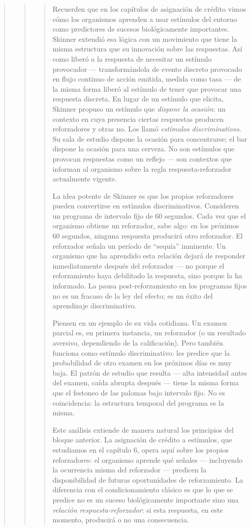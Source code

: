 \documentclass[
  letterpaper,
  DIV=11,
  numbers=noendperiod]{scrreprt}
\begin{document}
\begin{tcolorbox}[enhanced jigsaw, toprule=.15mm, arc=.35mm, colback=white, opacityback=0, colframe=quarto-callout-note-color-frame, breakable, rightrule=.15mm, left=2mm, leftrule=.75mm, bottomrule=.15mm]
\begin{quote}
\begin{quote}
\begin{quote}
Recuerden que en los capítulos de asignación de crédito vimos cómo los
organismos aprenden a usar estímulos del entorno como predictores de
sucesos biológicamente importantes. Skinner extendió esa lógica con un
movimiento que tiene la misma estructura que su innovación sobre las
respuestas. Así como liberó a la respuesta de necesitar un estímulo
provocador --- transformándola de evento discreto provocado en flujo
continuo de acción emitida, medida como tasa --- de la misma forma
liberó al estímulo de tener que provocar una respuesta discreta. En
lugar de un estímulo que elicita, Skinner propuso un estímulo que
\emph{dispone la ocasión}: un contexto en cuya presencia ciertas
respuestas producen reforzadores y otras no. Los llamó \emph{estímulos
discriminativos}. Su sala de estudio dispone la ocasión para
concentrarse; el bar dispone la ocasión para una cerveza. No son
estímulos que provocan respuestas como un reflejo --- son contextos que
informan al organismo sobre la regla respuesta-reforzador actualmente
vigente.

La idea potente de Skinner es que los propios reforzadores pueden
convertirse en estímulos discriminativos. Consideren un programa de
intervalo fijo de 60 segundos. Cada vez que el organismo obtiene un
reforzador, sabe algo: en los próximos 60 segundos, ninguna respuesta
producirá otro reforzador. El reforzador señala un período de ``sequía''
inminente. Un organismo que ha aprendido esta relación dejará de
responder inmediatamente después del reforzador --- no porque el
reforzamiento haya debilitado la respuesta, sino porque la ha informado.
La pausa post-reforzamiento en los programas fijos no es un fracaso de
la ley del efecto; es un éxito del aprendizaje discriminativo.

Piensen en un ejemplo de su vida cotidiana. Un examen parcial es, en
primera instancia, un reforzador (o un resultado aversivo, dependiendo
de la calificación). Pero también funciona como estímulo discriminativo:
les predice que la probabilidad de otro examen en los próximos días es
muy baja. El patrón de estudio que resulta --- alta intensidad antes del
examen, caída abrupta después --- tiene la misma forma que el festoneo
de las palomas bajo intervalo fijo. No es coincidencia: la estructura
temporal del programa es la misma.

Este análisis extiende de manera natural los principios del bloque
anterior. La asignación de crédito a estímulos, que estudiamos en el
capítulo 6, opera aquí sobre los propios reforzadores: el organismo
aprende qué señales --- incluyendo la ocurrencia misma del reforzador
--- predicen la disponibilidad de futuras oportunidades de
reforzamiento. La diferencia con el condicionamiento clásico es que lo
que se predice no es un suceso biológicamente importante sino una
\emph{relación respuesta-reforzador}: si esta respuesta, en este
momento, producirá o no una consecuencia.


\end{quote}
\end{quote}
\end{quote}
\end{tcolorbox}
\end{document}
